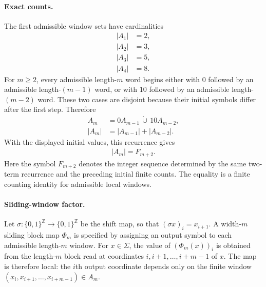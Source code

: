 \paragraph{Exact counts.}
The first admissible window sets have cardinalities
$$
\begin{aligned}
|A_1|&=2,\\
|A_2|&=3,\\
|A_3|&=5,\\
|A_4|&=8.
\end{aligned}
$$
For $m\geq2$, every admissible length-$m$ word begins either with $0$ followed by an admissible length-$(m-1)$ word, or with $10$ followed by an admissible length-$(m-2)$ word. These two cases are disjoint because their initial symbols differ after the first step. Therefore
$$
\begin{aligned}
A_m &= 0A_{m-1}\,\dot\cup\,10A_{m-2},\\
|A_m|&=|A_{m-1}|+|A_{m-2}|.
\end{aligned}
$$
With the displayed initial values, this recurrence gives
$$
\begin{aligned}
|A_m|=F_{m+2}.
\end{aligned}
$$
Here the symbol $F_{m+2}$ denotes the integer sequence determined by the same two-term recurrence and the preceding initial finite counts. The equality is a finite counting identity for admissible local windows.

\paragraph{Sliding-window factor.}
Let $\sigma:\{0,1\}^{\mathbb Z}\to\{0,1\}^{\mathbb Z}$ be the shift map, so that $(\sigma x)_i=x_{i+1}$. A width-$m$ sliding block map $\Phi_m$ is specified by assigning an output symbol to each admissible length-$m$ window. For $x\in\Sigma$, the value of $(\Phi_m(x))_i$ is obtained from the length-$m$ block read at coordinates $i,i+1,\ldots,i+m-1$ of $x$. The map is therefore local: the $i$th output coordinate depends only on the finite window $(x_i,x_{i+1},\ldots,x_{i+m-1})\in A_m$.

